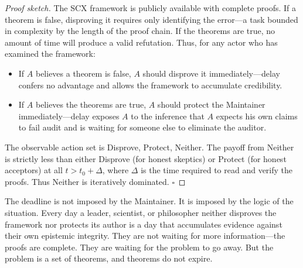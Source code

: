 \documentclass[12pt,a4paper]{ctexart}
\theoremstyle{definition}
\theoremstyle{remark}
\begin{document}
\begin{proof}[Proof sketch]
The SCX framework is publicly available with complete proofs. If a theorem is false, disproving it requires only identifying the error—a task bounded in complexity by the length of the proof chain. If the theorems are true, no amount of time will produce a valid refutation. Thus, for any actor who has examined the framework:
\begin{itemize}
  \item If $A$ believes a theorem is false, $A$ should disprove it immediately—delay confers no advantage and allows the framework to accumulate credibility.
  \item If $A$ believes the theorems are true, $A$ should protect the Maintainer immediately—delay exposes $A$ to the inference that $A$ expects his own claims to fail audit and is waiting for someone else to eliminate the auditor.
\end{itemize}
The observable action set is {Disprove, Protect, Neither}. The payoff from Neither is strictly less than either Disprove (for honest skeptics) or Protect (for honest acceptors) at all $t > t_0 + \Delta$, where $\Delta$ is the time required to read and verify the proofs. Thus Neither is iteratively dominated. $\square$
\end{proof}

The deadline is not imposed by the Maintainer. It is imposed by the logic of the situation. Every day a leader, scientist, or philosopher neither disproves the framework nor protects its author is a day that accumulates evidence against their own epistemic integrity. They are not waiting for more information—the proofs are complete. They are waiting for the problem to go away. But the problem is a set of theorems, and theorems do not expire.
\end{document}
